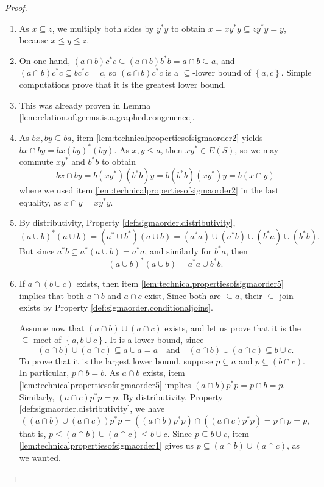 \begin{proof}
    \begin{enumerate}[label={\ref{lem:technicalpropertiesofsigmaorder\arabic*}}]
        \item As $x\subseteq z$, we multiply both sides by $y^*y$ to obtain $x=xy^*y\subseteq zy^*y=y$, because $x\leq y\leq z$.
        \item On one hand, $(a\cap b)c^*c\subseteq (a\cap b)b^*b=a\cap b\subseteq a$, and $(a\cap b)c^*c\subseteq bc^*c=c$, so $(a\cap b)c^*c$ is a $\subseteq$-lower bound of $\left\{a,c\right\}$. Simple computations prove that it is the greatest lower bound.
        \item This was already proven in Lemma \ref{lem:relation.of.germs.is.a.graphed.congruence}.
        \item As $bx,by\subseteq ba$, item \ref{lem:technicalpropertiesofsigmaorder2} yields $bx\cap by=bx(by)^*(by)$. As $x,y\leq a$, then $xy^*\in E(S)$, so we may commute $xy^*$ and $b^*b$ to obtain
        \[bx\cap by=b(xy^*)(b^*b)y=b(b^*b)(xy^*)y=b(x\cap y)\]
        where we used item \ref{lem:technicalpropertiesofsigmaorder2} in the last equality, as $x\cap y=xy^*y$.
        
        \item By distributivity, Property \ref{def:sigmaorder.distributivity},
        \[(a\cup b)^*(a\cup b)=(a^*\cup b^*)(a\cup b)=(a^*a)\cup(a^*b)\cup(b^*a)\cup(b^*b).\]
        But since $a^*b\subseteq a^*(a\cup b)=a^*a$, and similarly for $b^*a$, then
        \[(a\cup b)^*(a\cup b)=a^*a\cup b^*b.\]
        
        \item If $a\cap(b\cup c)$ exists, then item \ref{lem:technicalpropertiesofsigmaorder5} implies that both $a\cap b$ and $a\cap c$ exist, Since both are $\subseteq a$, their $\subseteq$-join exists by Property \ref{def:sigmaorder.conditionaljoins}.
        
        Assume now that $(a\cap b)\cup(a\cap c)$ exists, and let us prove that it is the $\subseteq$-meet of $\left\{a,b\cup c\right\}$. It is a lower bound, since
        \[(a\cap b)\cup(a\cap c)\subseteq a\cup a=a\quad\text{and}\quad (a\cap b)\cup(a\cap c)\subseteq b\cup c.\]
        To prove that it is the largest lower bound, suppose $p\subseteq a$ and $p\subseteq (b\cap c)$. In particular, $p\cap b=b$. As $a\cap b$ exists, item \ref{lem:technicalpropertiesofsigmaorder5} implies $(a\cap b)p^*p=p\cap b=p$. Similarly, $(a\cap c)p^*p=p$. By distributivity, Property \ref{def:sigmaorder.distributivity}, we have
        \[((a\cap b)\cup(a\cap c))p^*p=((a\cap b)p^*p)\cap ((a\cap c)p^*p)=p\cap p=p,\]
        that is, $p\leq(a\cap b)\cup(a\cap c)\leq b\cup c$. Since $p\subseteq b\cup c$, item \ref{lem:technicalpropertiesofsigmaorder1} gives us $p\subseteq (a\cap b)\cup(a\cap c)$, as we wanted.
        

\end{enumerate}
\end{proof}
